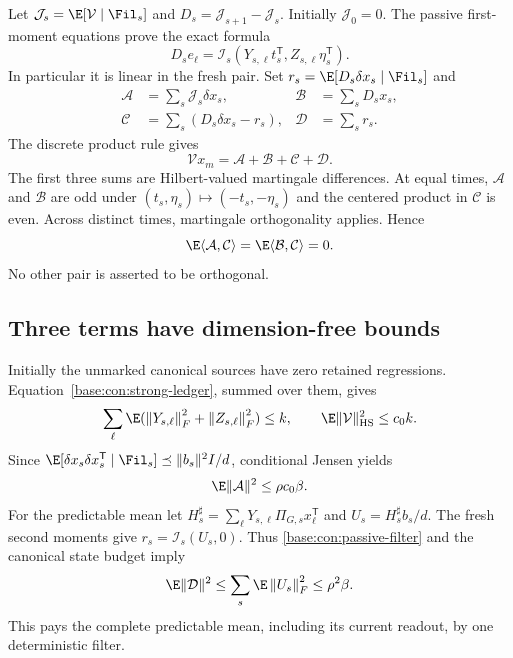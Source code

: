 \documentclass[11pt,oneside,openany,a4paper]{book}
\numberwithin{equation}{chapter}
\theoremstyle{definition}
\theoremstyle{remark}
\newcommand{\T}{\mathsf T}\newcommand{\Id}{I}
\newcommand{\F}[1]{\left\lVert#1\right\rVert_F}
\begin{document}
Let $\mathcal J_s=\E[\mathcal V\mid\Fil_s]$ and $D_s=\mathcal J_{s+1}-\mathcal J_s$. Initially $\mathcal J_0=0$. The passive first-moment equations prove the exact formula
\begin{equation}\label{base:con:Doob-increment}
 D_se_\ell=\mathcal I_s(Y_{s,\ell}t_s^\T,Z_{s,\ell}\eta_s^\T).
\end{equation}
In particular it is linear in the fresh pair. Set $r_s=\E[D_s\delta x_s\mid\Fil_s]$ and
\begin{align}
 \mathcal A&=\sum_s\mathcal J_s\delta x_s,&
 \mathcal B&=\sum_sD_sx_s,\nonumber\\
 \mathcal C&=\sum_s(D_s\delta x_s-r_s),&
 \mathcal D&=\sum_sr_s.\label{base:con:ABCD}
\end{align}
The discrete product rule gives
\begin{equation}\label{base:con:product-identity}
 \mathcal Vx_m=\mathcal A+\mathcal B+\mathcal C+\mathcal D.
\end{equation}
The first three sums are Hilbert-valued martingale differences. At equal times, $\mathcal A$ and $\mathcal B$ are odd under $(t_s,\eta_s)\mapsto(-t_s,-\eta_s)$ and the centered product in $\mathcal C$ is even. Across distinct times, martingale orthogonality applies. Hence
\begin{equation}\label{base:con:parity-product}
 \E\langle\mathcal A,\mathcal C\rangle=
 \E\langle\mathcal B,\mathcal C\rangle=0.
\end{equation}
No other pair is asserted to be orthogonal.

\subsection{Three terms have dimension-free bounds}
Initially the unmarked canonical sources have zero retained regressions. Equation~\eqref{base:con:strong-ledger}, summed over them, gives
\[
 \sum_\ell\E(\F{Y_{s,\ell}}^2+\F{Z_{s,\ell}}^2)\le k,
 \qquad\E\|\mathcal V\|_{\rm HS}^2\le c_0k.
\]
Since $\E[\delta x_s\delta x_s^\T\mid\Fil_s]\preceq\|b_s\|^2I/d$, conditional Jensen yields
\begin{equation}\label{base:con:A-old}
 \E\|\mathcal A\|^2\le\rho c_0\beta.
\end{equation}
For the predictable mean let
$H_s^\sharp=\sum_\ell Y_{s,\ell}\Pi_{G,s}x_\ell^\T$ and
$U_s=H_s^\sharp b_s/d$. The fresh second moments give
$r_s=\mathcal I_s(U_s,0)$. Thus \eqref{base:con:passive-filter} and the canonical state budget imply
\begin{equation}\label{base:con:D}
 \E\|\mathcal D\|^2\le\sum_s\E\F{U_s}^2\le\rho^2\beta.
\end{equation}
This pays the complete predictable mean, including its current readout, by one deterministic filter.
\end{document}
